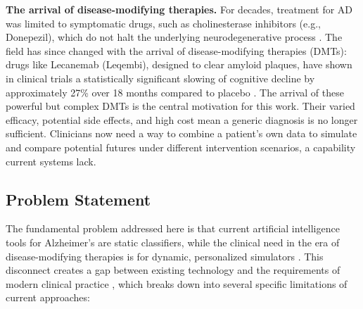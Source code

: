\documentclass[pdflatex,sn-mathphys-num]{sn-jnl}%
\theoremstyle{thmstyleone}%
\theoremstyle{thmstyletwo}%
\theoremstyle{thmstylethree}%
\begin{document}
\textbf{The arrival of disease-modifying therapies.} For decades, treatment for AD
was limited to symptomatic drugs, such as cholinesterase inhibitors
(e.g., Donepezil), which do not halt the underlying neurodegenerative
process \cite{bib23}. The field has since changed with the arrival of
disease-modifying therapies (DMTs): drugs like Lecanemab (Leqembi),
designed to clear amyloid plaques, have shown in clinical trials a
statistically significant slowing of cognitive decline by approximately
27\% over 18 months compared to placebo \cite{bib24}. The arrival of these
powerful but complex DMTs is the central motivation for this work. Their
varied efficacy, potential side effects, and high cost mean a generic
diagnosis is no longer sufficient. Clinicians now need a way to combine
a patient's own data to simulate and compare potential futures under
different intervention scenarios, a capability current systems lack.

\subsection{Problem Statement}\label{problem-statement}

The fundamental problem addressed here is that current artificial
intelligence tools for Alzheimer's are static classifiers, while the
clinical need in the era of disease-modifying therapies is for dynamic,
personalized simulators \cite{bib10,bib11,bib25}. This disconnect creates a gap
between existing technology and the requirements of modern clinical
practice \cite{bib26,bib27}, which breaks down into several specific
limitations of current approaches:
\end{document}
